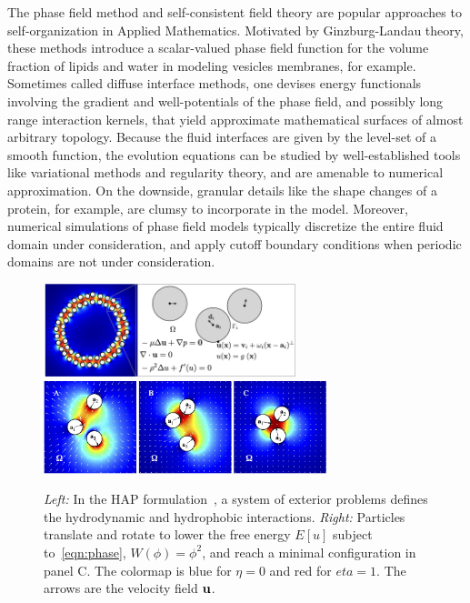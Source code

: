 The phase field method and self-consistent field theory are popular
approaches to self-organization in Applied Mathematics. Motivated by
Ginzburg-Landau theory, these methods introduce a scalar-valued phase
field function for the volume fraction of lipids and water in modeling
vesicles membranes, for example. Sometimes called diffuse interface
methods, one devises energy functionals involving the gradient and
well-potentials of the phase field, and possibly long range interaction
kernels, that yield approximate mathematical surfaces of almost
arbitrary topology. Because the fluid interfaces are given by the
level-set of a smooth function, the evolution equations can be studied
by well-established tools like variational methods and regularity
theory, and are amenable to numerical approximation. On the downside,
granular details like the shape changes of a protein, for example, are
clumsy to incorporate in the model. Moreover, numerical simulations of
phase field models typically discretize the entire fluid domain under
consideration, and apply cutoff boundary conditions when periodic
domains are not under consideration. 

\begin{figure}
  \begin{center}
    \includegraphics[keepaspectratio,height=2.7cm]{figures/SpecificAim1/Domain.jpg}
    \includegraphics[keepaspectratio,height=2.7cm]{figures/SpecificAim1/3Particles.jpg}
  \end{center}
  \caption{\label{fig:flow_map} \footnotesize {\em Left:} In the HAP
  formulation~\cite{Fu2018_SIAM}, a system of exterior problems defines
  the hydrodynamic and hydrophobic interactions. {\em Right:} Particles
  translate and rotate to lower the free energy $E[u]$ subject
  to~\eqref{eqn:phase}, $W(\phi) = \phi^2$, and reach a minimal
  configuration in panel C. The colormap is blue for $\eta = 0$ and red
  for $eta = 1$. The arrows are the velocity field $\mathbf{u}$.}
\end{figure}

